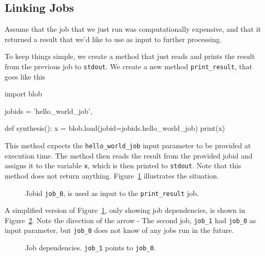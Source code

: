 \documentclass[a4paper]{article}
\begin{document}
\subsection{Linking Jobs}
Assume that the job that we just run was computationally expensive,
and that it returned a result that we'd like to use as input to further
processing.

To keep things simple, we create a method that just reads and prints
the result from the previous job to \texttt{stdout}.  We create a new
method \texttt{print\_result}, that goes like this

\begin{python}
import blob
  
jobids = {'hello_world_job',}

def synthesis():
    x = blob.load(jobid=jobids.hello_world_job)
    print(x)
\end{python}

This method expects the \texttt{hello\_world\_job} input parameter to
be provided at execution time.  The method then reads the result from
the provided jobid and assigns it to the variable \texttt{x}, which is
then printed to \texttt{stdout}.  Note that this method does not
return anything.  Figure~\ref{fig:execflow-print-result} illustrates
the situation.

\begin{figure}[h!]
  \begin{center}
    
    \caption{Jobid \texttt{job\_0}, is used as input to the
      \texttt{print\_result} job.}
    \label{fig:execflow-print-result}
  \end{center}
\end{figure}

A simplified version of Figure~\ref{fig:execflow-print-result}, only
showing job dependencies, is shown in
Figure~\ref{fig:depflow-twojobs}.  Note the direction of the arrow -
The second job, \texttt{job\_1} had \texttt{job\_0} as input
parameter, but \texttt{job\_0} does not know of any jobs run in the
future.

\begin{figure}[h!]
  \begin{center}
    
    \caption{Job dependencies.  \texttt{job\_1} points to
      \texttt{job\_0}.}
    \label{fig:depflow-twojobs}
  \end{center}
\end{figure}


\clearpage
\end{document}
